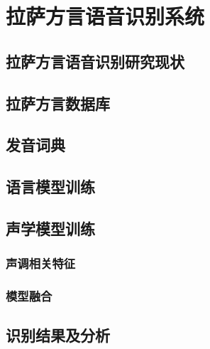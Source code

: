 ﻿%

\chapter{拉萨方言语音识别系统}
\section{拉萨方言语音识别研究现状}
\section{拉萨方言数据库}
\section{发音词典}
\section{语言模型训练}
\section{声学模型训练}
\subsection{声调相关特征}
\subsection{模型融合}
\section{识别结果及分析}
